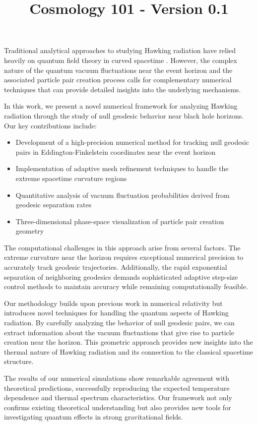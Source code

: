 \documentclass{article}\usepackage{graphicx} \usepackage{amsmath} \usepackage{colortbl}\title{Cosmology 101 - Version 0.1}
\begin{document}
Traditional analytical approaches to studying Hawking radiation have relied heavily on quantum field theory in curved spacetime \cite{birrell1984}. However, the complex nature of the quantum vacuum fluctuations near the event horizon and the associated particle pair creation process calls for complementary numerical techniques that can provide detailed insights into the underlying mechanisms.

In this work, we present a novel numerical framework for analyzing Hawking radiation through the study of null geodesic behavior near black hole horizons. Our key contributions include:

\begin{itemize}
 \item Development of a high-precision numerical method for tracking null geodesic pairs in Eddington-Finkelstein coordinates near the event horizon
 \item Implementation of adaptive mesh refinement techniques to handle the extreme spacetime curvature regions
 \item Quantitative analysis of vacuum fluctuation probabilities derived from geodesic separation rates
 \item Three-dimensional phase-space visualization of particle pair creation geometry
\end{itemize}

The computational challenges in this approach arise from several factors. The extreme curvature near the horizon requires exceptional numerical precision to accurately track geodesic trajectories. Additionally, the rapid exponential separation of neighboring geodesics demands sophisticated adaptive step-size control methods to maintain accuracy while remaining computationally feasible.

Our methodology builds upon previous work in numerical relativity \cite{pretorius2005} but introduces novel techniques for handling the quantum aspects of Hawking radiation. By carefully analyzing the behavior of null geodesic pairs, we can extract information about the vacuum fluctuations that give rise to particle creation near the horizon. This geometric approach provides new insights into the thermal nature of Hawking radiation and its connection to the classical spacetime structure.

The results of our numerical simulations show remarkable agreement with theoretical predictions, successfully reproducing the expected temperature dependence and thermal spectrum characteristics. Our framework not only confirms existing theoretical understanding but also provides new tools for investigating quantum effects in strong gravitational fields.
\end{document}

